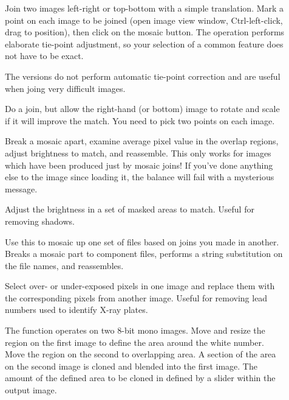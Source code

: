 \begin{description}

\item[]
	Join two images left-right or top-bottom with a simple
	translation. Mark a point on each image to be joined (open image
	view window, Ctrl-left-click, drag to position), then click on the
	mosaic button. The
	operation performs elaborate tie-point adjustment, so your selection
	of a common feature does not have to be exact.

	The  versions do not perform automatic tie-point correction
	and are useful when joing very difficult images.

\item[]
	Do a join, but allow the right-hand (or bottom) image to rotate and
	scale if it will improve the match. You need to pick two points on
	each image.

\item[]
	Break a mosaic apart, examine average pixel value in the overlap
	regions, adjust brightness to match, and reassemble. This only works
	for images which have been produced just by mosaic joins! If you've
	done anything else to the image since loading it, the balance will
	fail with a mysterious message.

\item[]
	Adjust the brightness in a set of masked areas to match. Useful for
	removing shadows.

\item[]
	Use this to mosaic up one set of files based on joins you made
	in another.  Breaks a mosaic part to component files, performs a
	string substitution on the file names, and reassembles. 

\item[]
	Select over- or under-exposed pixels in one image and replace them
	with the corresponding pixels from another image. Useful for removing
	lead numbers used to identify X-ray plates.

	The function
	operates on two 8-bit mono images.  Move and resize the region
	on the first image to define the area around the white number.
	Move the region on the second to overlapping area.  A section of the
	area on the second image is cloned and blended into the first image.
	The amount of the defined area to be cloned in defined by a slider
	within the output image.

\end{description}

